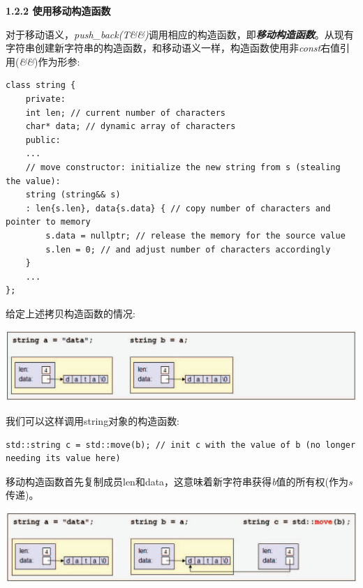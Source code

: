 \hspace*{\fill} \par %
\textbf{1.2.2 使用移动构造函数}

对于移动语义，\textit{push\_back(T\&\&)}调用相应的构造函数，即\textit{\textbf{移动构造函数}}。从现有字符串创建新字符串的构造函数，和移动语义一样，构造函数使用非\textit{const}右值引用(\textit{\&\&})作为形参:\par

\begin{lstlisting}[caption={}]
class string {
	private:
	int len; // current number of characters
	char* data; // dynamic array of characters
	public:
	...
	// move constructor: initialize the new string from s (stealing the value):
	string (string&& s)
	: len{s.len}, data{s.data} { // copy number of characters and pointer to memory
		s.data = nullptr; // release the memory for the source value
		s.len = 0; // and adjust number of characters accordingly
	}
	...
};
\end{lstlisting}

给定上述拷贝构造函数的情况:\par

\begin{center}
	\includegraphics[width=1.0\textwidth]{content/1/chapter1/images/20}
\end{center}

我们可以这样调用string对象的构造函数:\par

\begin{lstlisting}[caption={}]
std::string c = std::move(b); // init c with the value of b (no longer needing its value here)
\end{lstlisting}

移动构造函数首先复制成员len和data，这意味着新字符串获得\textit{b}值的所有权(作为\textit{s}传递)。\par

\begin{center}
	\includegraphics[width=1.0\textwidth]{content/1/chapter1/images/21}
\end{center}

